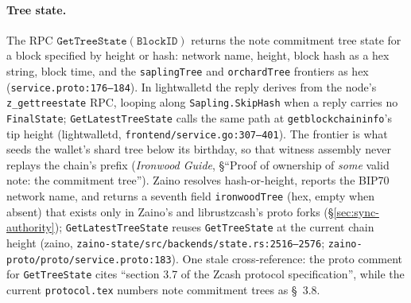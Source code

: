 \documentclass[11pt,a4paper]{article}
\theoremstyle{definition}
\begin{document}
\paragraph{Tree state.} The RPC
$\mathtt{GetTreeState}(\mathtt{BlockID})$ returns the note commitment tree
state for a block specified by height or hash: network name, height, block
hash as a hex string, block time, and the \texttt{saplingTree} and
\texttt{orchardTree} frontiers as hex (\texttt{service.proto:176--184}).
In lightwalletd the reply derives from the node's
\texttt{z\_gettreestate} RPC,
looping along \texttt{Sapling.SkipHash} when a reply carries no
\texttt{FinalState}; \texttt{GetLatestTreeState} calls the same path at
\texttt{getblockchaininfo}'s tip height (\textsf{lightwalletd},
\texttt{frontend/service.go:307--401}). The frontier is what seeds the
wallet's shard tree below its birthday, so that witness assembly never
replays the chain's prefix (\emph{Ironwood Guide}, \S``Proof of ownership
of \emph{some} valid note: the commitment tree''). Zaino resolves
hash-or-height, reports the BIP70 network name, and returns a seventh
field \texttt{ironwoodTree} (hex, empty when absent) that exists only in
Zaino's and librustzcash's proto forks (\S\ref{sec:sync-authority});
\texttt{GetLatestTreeState} reuses \texttt{GetTreeState} at the current
chain height (\textsf{zaino},
\texttt{zaino-state/src/backends/state.rs:2516--2576};
\texttt{zaino-proto/proto/service.proto:183}). One stale cross-reference:
the proto comment for \texttt{GetTreeState} cites ``section 3.7 of the
Zcash protocol specification'', while the current
\texttt{protocol.tex} numbers note commitment trees as \S~3.8.
\end{document}
